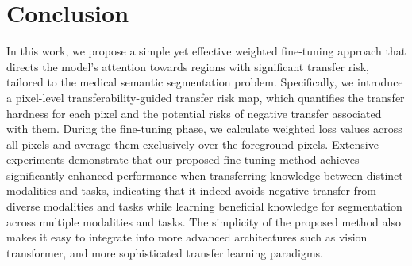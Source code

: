 \section{Conclusion}
In this work, we propose a simple yet effective weighted fine-tuning approach that directs the model's attention towards regions with significant transfer risk, tailored to the medical semantic segmentation problem. Specifically, we introduce a pixel-level transferability-guided transfer risk map, which quantifies the transfer hardness for each pixel and the potential risks of negative transfer associated with them. During the fine-tuning phase, we calculate weighted loss values across all pixels and average them exclusively over the foreground pixels. Extensive experiments demonstrate that our proposed fine-tuning method achieves significantly enhanced performance when transferring knowledge between distinct modalities and tasks, indicating that it indeed avoids negative transfer from diverse modalities and tasks while learning beneficial knowledge for segmentation across multiple modalities and tasks. The simplicity of the proposed method also makes it easy to integrate into more advanced architectures such as vision transformer, and more sophisticated transfer learning paradigms. 

